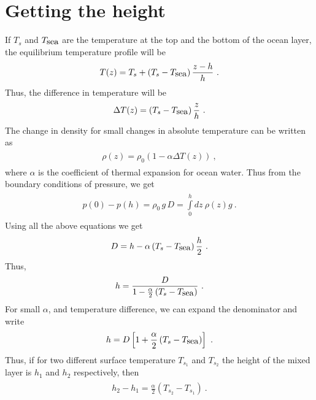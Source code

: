 \documentclass[fontsize = 13pt]{scrartcl}
\begin{document}
\section{Getting the height}
If \(T_s\) and \(T_{\mbox{sea}}\) are the temperature at the top and the bottom of the ocean layer, the equilibrium temperature profile will be
\begin{align}
\begin{split}
    T(z) = T_s + \left( T_s - T_{\mbox{sea}} \right)\frac{z -h}{h} \ .
\end{split}
\end{align}
Thus, the difference in temperature will be 
\begin{align}
\begin{split}
    \Delta T (z) = \left( T_s - T_{\mbox{sea}} \right)\frac{z}{h} \ .
\end{split}
\end{align}
The change in density for small changes in absolute temperature can be written as
\begin{align}
\begin{split}
    \rho(z) = \rho_0 \left( 1 -\alpha \Delta T(z) \right) \ ,
\end{split}
\end{align}
where \(\alpha\) is the coefficient of thermal expansion for ocean water. Thus from the boundary conditions of pressure, we get
\begin{align}
\begin{split}
    p(0) - p(h) =    \rho_0\,g\,D  = \int\limits_{0}^{h} dz\  \rho(z) g  \ . 
\end{split}
\end{align}
Using all the above equations we get
\begin{align}
\begin{split}
    D = h - \alpha \left( T_s - T_{\mbox{sea}} \right)\frac{h}{2} \ .
\end{split}
\end{align}
Thus, 
\begin{align}
\begin{split}
    h = \frac{D}{1 - \frac{\alpha}{2} \left( T_s - T_{\mbox{sea}} \right)} \ .
\end{split}
\end{align}
For small \(\alpha\), and temperature difference, we can expand the denominator and write
\begin{align}
\begin{split}
    h = D\left[ 1 +   \frac{\alpha}{2} \left( T_s - T_{\mbox{sea}} \right)\right] \ .
\end{split}
\end{align}
Thus, if for two different surface temperature $T_{s_1}$ and $T_{s_2}$ the height of the mixed layer is $h_1$ and $h_2$ respectively, then 
\begin{align}
\begin{split}
    h_2 - h_1 = \frac{\alpha}{2} \left( T_{s_2} -  T_{s_1} \right) \ .
\end{split}
\end{align}
\end{document}
